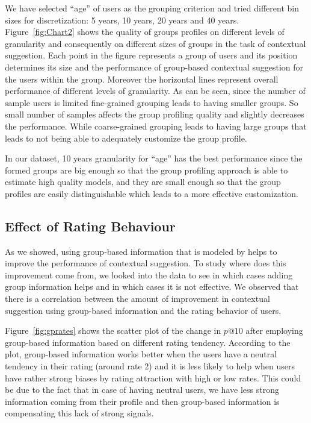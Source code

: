 We have selected ``age'' of users as the grouping criterion and tried different bin sizes for discretization: 5 years, 10 years, 20 years and 40 years. 
Figure~\ref{fig:Chart2} shows the quality of groups profiles on different levels of granularity and consequently on different sizes of groups in the task of contextual suggestion. 
Each point in the figure represents a group of users and its position determines its size and the performance of group-based contextual suggestion for the users within the group. Moreover the horizontal lines represent overall performance of different levels of granularity. 
As can be seen, since the number of sample users is limited fine-grained grouping leads to having smaller groups. So small number of samples affects the group profiling quality and slightly decreases the performance. While coarse-grained grouping leads to having large groups that leads to not being able to adequately customize the group profile. 

In our dataset, 10 years granularity for ``age'' has the best performance since the formed groups are big enough so that the group profiling approach is able to estimate high quality models, and they are small enough so that the group profiles are easily distinguishable which leads to a more effective customization.


\subsection{Effect of Rating Behaviour}
\label{sec:rb}
As we showed, using group-based information that is modeled by \acswlm helps to improve the performance of contextual suggestion. To study where does this improvement come from, we looked into the data to see in which cases adding group information helps and in which cases it is not effective. We observed that there is a correlation between the amount of improvement in contextual suggestion using group-based information and the rating behavior of users.



Figure~\ref{fig:gprates} shows the scatter plot of the change in $p@10$ after employing group-based information based on different rating tendency.
According to the plot, group-based information works better when the users have a neutral tendency in their rating (around rate 2) and it is less likely to help when users have rather strong biases by rating attraction with high or low rates. This could be due to the fact that in case of having neutral users, we have less strong information coming from their profile and then group-based information is compensating this lack of strong signals.